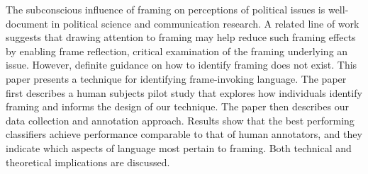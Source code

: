 The subconscious influence of framing on perceptions of political issues is well-document in political science and communication research. A related line of work suggests that drawing attention to framing may help reduce such framing effects by enabling frame reflection, critical examination of the framing underlying an issue. However, definite guidance on how to identify framing does not exist. This paper presents a technique for identifying frame-invoking language. The paper first describes a human subjects pilot study that explores how individuals identify framing and informs the design of our technique. The paper then describes our data collection and annotation approach. Results show that the best performing classifiers achieve performance comparable to that of human annotators, and they indicate which aspects of language most pertain to framing. Both technical and theoretical implications are discussed.
